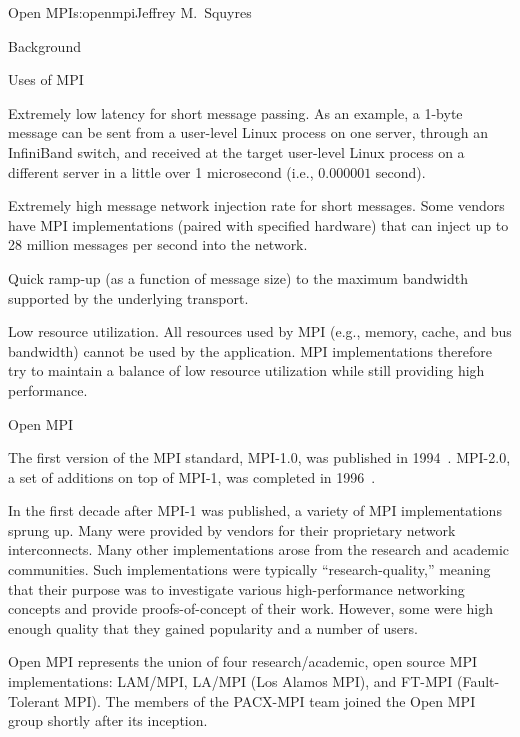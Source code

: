 \begin{aosachapter}{Open MPI}{s:openmpi}{Jeffrey M.\ Squyres}
\begin{aosasect1}{Background}
\begin{aosasect2}{Uses of MPI}
\begin{aosaitemize}
\item Extremely low latency for short message passing.  As an example,
  a 1-byte message can be sent from a user-level Linux process on one
  server, through an InfiniBand switch, and received at the target
  user-level Linux process on a different server in a little over 1
  microsecond (i.e., $0.000001$ second).
\item Extremely high message network injection rate for short
  messages.  Some vendors have MPI implementations (paired with
  specified hardware) that can inject up to 28 million messages per
  second into the network.
\item Quick ramp-up (as a function of message size) to the maximum
  bandwidth supported by the underlying transport.
\item Low resource utilization.  All resources used by MPI (e.g.,
  memory, cache, and bus bandwidth) cannot be used by the application.
  MPI implementations therefore try to maintain a balance of low
  resource utilization while still providing high performance.
\end{aosaitemize}

\end{aosasect2}


\begin{aosasect2}{Open MPI}

The first version of the MPI standard, MPI-1.0, was published in
1994~\cite{bib:mpi-forum-93}.  
MPI-2.0, a set of additions on top of MPI-1, was completed in
1996~\cite{bib:mpi-geist-96}.

In the first decade after MPI-1 was published, a variety of MPI
implementations sprung up.  Many were provided by vendors for their
proprietary network interconnects.  Many other implementations arose
from the research and academic communities.  Such implementations were
typically ``research-quality,'' meaning that their purpose was to
investigate various high-performance networking concepts and provide
proofs-of-concept of their work.  However, some were high enough
quality that they gained popularity and a number of users.

Open MPI represents the union of four research/academic, open source
MPI implementations: LAM/MPI, LA/MPI (Los Alamos MPI), and FT-MPI
(Fault-Tolerant MPI).
%
The members of the PACX-MPI team joined the Open MPI group shortly
after its inception.


\end{aosasect2}
\end{aosasect1}
\end{aosachapter}
